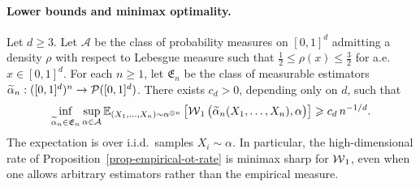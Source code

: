 \paragraph{Lower bounds and minimax optimality.}
\begin{prop}\label{prop-minimax-lower-w1-density}
Let \(d\geq3\). Let \(\mathcal A\) be the class of probability measures on \([0,1]^d\) admitting a density \(\rho\) with respect to Lebesgue measure such that
$\frac12\leq \rho(x)\leq \frac32$ for a.e.\ $x\in[0,1]^d$.
For each \(n\geq1\), let \(\mathfrak E_n\) be the class of measurable estimators \(\widetilde\alpha_n:([0,1]^d)^n\to\mathcal{P}([0,1]^d)\).
There exists \(c_d>0\), depending only on \(d\), such that
\[
\inf_{\widetilde\alpha_n\in\mathfrak E_n}
\sup_{\alpha\in\mathcal A}
\mathbb{E}_{(X_1,\ldots,X_n)\sim\alpha^{\otimes n}}
\left[
\operatorname{\mathcal{W}}_1\big(\widetilde\alpha_n(X_1,\ldots,X_n),\alpha\big)
\right]
\geqslant
c_d\,n^{-1/d}.
\]
The expectation is over i.i.d.\ samples \(X_i\sim\alpha\). In particular, the high-dimensional rate of Proposition~\ref{prop-empirical-ot-rate} is minimax sharp for \(\operatorname{\mathcal{W}}_1\), even when one allows arbitrary estimators rather than the empirical measure.
\end{prop}
